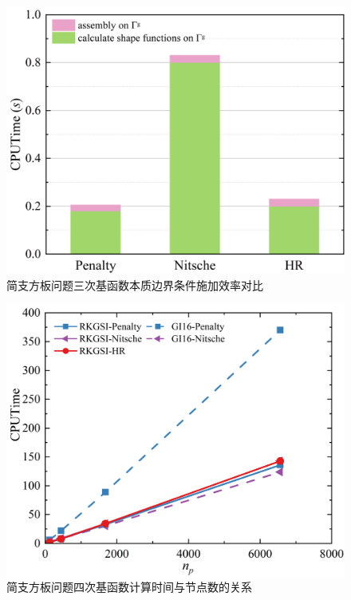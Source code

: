 \begin{figure}[H]
    \centering
    \includegraphics[scale=0.5]{figure/PHR/R/Cefficiency.png}
    \caption{简支方板问题三次基函数本质边界条件施加效率对比}
\end{figure}
\begin{figure}[H]
    \centering
    \includegraphics[scale=0.5]{figure/PHR/R/Qcputime.png}
    \caption{简支方板问题四次基函数计算时间与节点数的关系}
\end{figure}
\newpage
